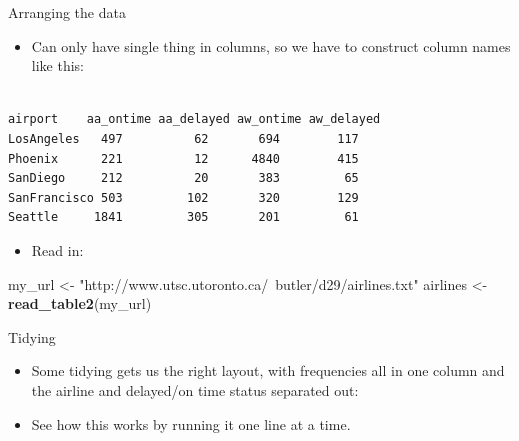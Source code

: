 \documentclass[
  ignorenonframetext,
]{beamer}
\newenvironment{Shaded}{\begin{snugshade}}{\end{snugshade}}
\newcommand{\KeywordTok}[1]{\textcolor[rgb]{0.13,0.29,0.53}{\textbf{#1}}}
\newcommand{\NormalTok}[1]{#1}
\newcommand{\OperatorTok}[1]{\textcolor[rgb]{0.81,0.36,0.00}{\textbf{#1}}}
\newcommand{\StringTok}[1]{\textcolor[rgb]{0.31,0.60,0.02}{#1}}
\providecommand{\tightlist}{%
  \setlength{\itemsep}{0pt}\setlength{\parskip}{0pt}}
\begin{document}
\begin{frame}[fragile]{Arranging the data}
\protect\hypertarget{arranging-the-data}{}

\begin{itemize}
\tightlist
\item
  Can only have single thing in columns, so we have to construct column
  names like this: \small
\end{itemize}

\begin{verbatim}

airport    aa_ontime aa_delayed aw_ontime aw_delayed
LosAngeles   497          62       694        117
Phoenix      221          12      4840        415
SanDiego     212          20       383         65
SanFrancisco 503         102       320        129
Seattle     1841         305       201         61
\end{verbatim}

\normalsize

\begin{itemize}
\tightlist
\item
  Read in:
\end{itemize}

\begin{Shaded}
\begin{Highlighting}[]
\NormalTok{my_url <-}\StringTok{ "http://www.utsc.utoronto.ca/~butler/d29/airlines.txt"}
\NormalTok{airlines <-}\StringTok{ }\KeywordTok{read_table2}\NormalTok{(my_url)}
\end{Highlighting}
\end{Shaded}

\end{frame}

\begin{frame}[fragile]{Tidying}
\protect\hypertarget{tidying-1}{}

\begin{itemize}
\tightlist
\item
  Some tidying gets us the right layout, with frequencies all in one
  column and the airline and delayed/on time status separated out:
\end{itemize}

\begin{Shaded}
\end{Shaded}

\begin{itemize}
\tightlist
\item
  See how this works by running it one line at a time.
\end{itemize}

\end{frame}
\end{document}
